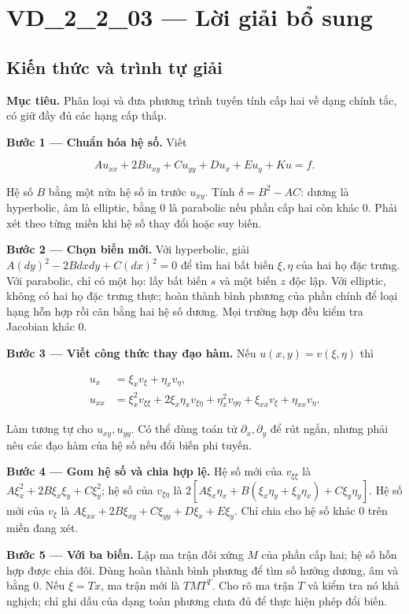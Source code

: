 \documentclass[10pt,a4paper]{article}
\begin{document}
\section*{VD\_2\_2\_03 — Lời giải bổ sung}
\subsection*{Kiến thức và trình tự giải}
\textbf{Mục tiêu.} Phân loại và đưa phương trình tuyến tính cấp hai về dạng chính tắc, có giữ đầy đủ các hạng cấp thấp.

\textbf{Bước 1 — Chuẩn hóa hệ số.} Viết


\[
A u_{xx}+2B u_{xy}+C u_{yy}+D u_x+E u_y+K u=f.
\]


Hệ số $B$ bằng một nửa hệ số in trước $u_{xy}$. Tính $\delta=B^2-AC$: dương là hyperbolic, âm là elliptic, bằng $0$ là parabolic nếu phần cấp hai còn khác $0$. Phải xét theo từng miền khi hệ số thay đổi hoặc suy biến.

\textbf{Bước 2 — Chọn biến mới.} Với hyperbolic, giải $A(dy)^2-2Bdxdy+C(dx)^2=0$ để tìm hai bất biến $\xi,\eta$ của hai họ đặc trưng. Với parabolic, chỉ có một họ: lấy bất biến $s$ và một biến $z$ độc lập. Với elliptic, không có hai họ đặc trưng thực; hoàn thành bình phương của phần chính để loại hạng hỗn hợp rồi cân bằng hai hệ số dương. Mọi trường hợp đều kiểm tra Jacobian khác $0$.

\textbf{Bước 3 — Viết công thức thay đạo hàm.} Nếu $u(x,y)=v(\xi,\eta)$ thì


\[
\begin{aligned}
u_x&=\xi_xv_\xi+\eta_xv_\eta,\\
u_{xx}&=\xi_x^2v_{\xi\xi}+2\xi_x\eta_xv_{\xi\eta}
+\eta_x^2v_{\eta\eta}+\xi_{xx}v_\xi+\eta_{xx}v_\eta.
\end{aligned}
\]


Làm tương tự cho $u_{xy},u_{yy}$. Có thể dùng toán tử $\partial_x,\partial_y$ để rút ngắn, nhưng phải nêu các đạo hàm của hệ số nếu đổi biến phi tuyến.

\textbf{Bước 4 — Gom hệ số và chia hợp lệ.} Hệ số mới của $v_{\xi\xi}$ là $A\xi_x^2+2B\xi_x\xi_y+C\xi_y^2$; hệ số của $v_{\xi\eta}$ là $2[A\xi_x\eta_x+B(\xi_x\eta_y+\xi_y\eta_x)+C\xi_y\eta_y]$. Hệ số mới của $v_\xi$ là $A\xi_{xx}+2B\xi_{xy}+C\xi_{yy}+D\xi_x+E\xi_y$. Chỉ chia cho hệ số khác $0$ trên miền đang xét.

\textbf{Bước 5 — Với ba biến.} Lập ma trận đối xứng $M$ của phần cấp hai; hệ số hỗn hợp được chia đôi. Dùng hoàn thành bình phương để tìm số hướng dương, âm và bằng $0$. Nếu $\xi=T x$, ma trận mới là $TMT^T$. Cho rõ ma trận $T$ và kiểm tra nó khả nghịch; chỉ ghi dấu của dạng toàn phương chưa đủ để thực hiện phép đổi biến.
\end{document}
